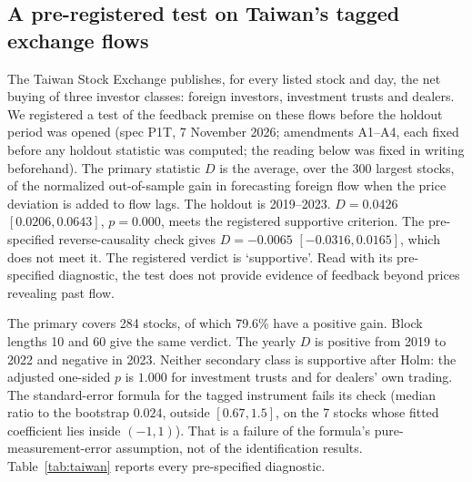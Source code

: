\documentclass[12pt]{article}
\theoremstyle{definition}
\theoremstyle{remark}
\begin{document}
\subsection{A pre-registered test on Taiwan's tagged exchange flows}\label{sec:taiwan}
The Taiwan Stock Exchange publishes, for every listed stock and day, the net buying of three investor classes: foreign investors, investment trusts and dealers. We registered a test of the feedback premise on these flows before the holdout period was opened (spec P1T, 7 November 2026; amendments A1--A4, each fixed before any holdout statistic was computed; the reading below was fixed in writing beforehand). The primary statistic $D$ is the average, over the 300 largest stocks, of the normalized out-of-sample gain in forecasting foreign flow when the price deviation is added to flow lags. The holdout is 2019--2023. $D=0.0426$ $[0.0206, 0.0643]$, $p=0.000$, meets the registered supportive criterion. The pre-specified reverse-causality check gives $D=-0.0065$ $[-0.0316, 0.0165]$, which does not meet it. The registered verdict is `supportive'. Read with its pre-specified diagnostic, the test does not provide evidence of feedback beyond prices revealing past flow.

The primary covers 284 stocks, of which 79.6\% have a positive gain. Block lengths 10 and 60 give the same verdict. The yearly $D$ is positive from 2019 to 2022 and negative in 2023. Neither secondary class is supportive after Holm: the adjusted one-sided $p$ is $1.000$ for investment trusts and for dealers' own trading. The standard-error formula for the tagged instrument fails its check (median ratio to the bootstrap $0.024$, outside $[0.67,1.5]$, on the 7 stocks whose fitted coefficient lies inside $(-1,1)$). That is a failure of the formula's pure-measurement-error assumption, not of the identification results. Table~\ref{tab:taiwan} reports every pre-specified diagnostic.
\end{document}
